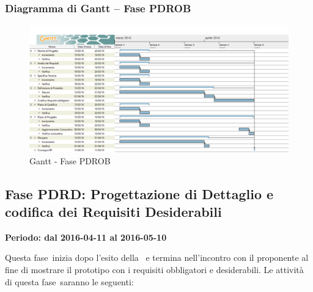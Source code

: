 \documentclass[../PianoProgetto.tex]{subfiles}
\begin{document}
		\subsubsection{Diagramma di Gantt – Fase PDROB}
			\begin{figure}[!h]
				\centering
				\includegraphics[width=\textwidth]{gantt_png/4-requisiti_obbligatori}
				\caption{Gantt - Fase PDROB}
				\label{fig:Gantt - Fase PDROB}
			\end{figure}
\newpage
	\subsection{Fase PDRD: Progettazione di Dettaglio e codifica dei Requisiti Desiderabili}
		\textbf{Periodo: dal 2016-04-11 al 2016-05-10}
		
		Questa fase\g\ inizia dopo l'esito della \revisionediprogettazione\ e termina nell'incontro con il proponente al fine di mostrare il prototipo con i requisiti obbligatori e desiderabili. Le attività di questa fase\g\ saranno le seguenti:
\end{document}
